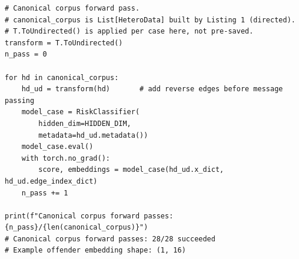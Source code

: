 \begin{lstlisting}
# Canonical corpus forward pass.
# canonical_corpus is List[HeteroData] built by Listing 1 (directed).
# T.ToUndirected() is applied per case here, not pre-saved.
transform = T.ToUndirected()
n_pass = 0

for hd in canonical_corpus:
    hd_ud = transform(hd)       # add reverse edges before message passing
    model_case = RiskClassifier(
        hidden_dim=HIDDEN_DIM,
        metadata=hd_ud.metadata())
    model_case.eval()
    with torch.no_grad():
        score, embeddings = model_case(hd_ud.x_dict, hd_ud.edge_index_dict)
    n_pass += 1

print(f"Canonical corpus forward passes: {n_pass}/{len(canonical_corpus)}")
# Canonical corpus forward passes: 28/28 succeeded
# Example offender embedding shape: (1, 16)
\end{lstlisting}
